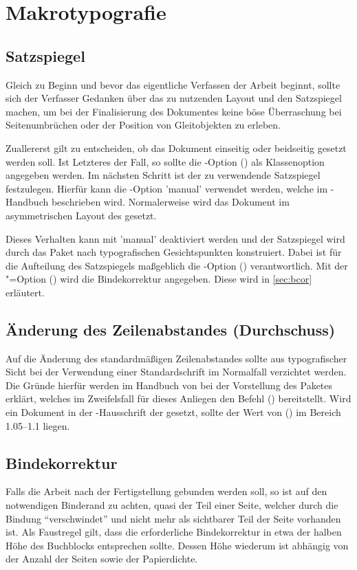 \documentclass[%
  english,ngerman,%
  cdgeometry=no,DIV=12,automark,%
]{tudscrartcl}
\begin{document}
\section{Makrotypografie}
\subsection{Satzspiegel}
Gleich zu Beginn und bevor das eigentliche Verfassen der Arbeit beginnt, sollte 
sich der Verfasser Gedanken über das zu nutzenden Layout und den Satzspiegel 
machen, um bei der Finalisierung des Dokumentes keine böse Überraschung bei 
Seitenumbrüchen oder der Position von Gleitobjekten zu erleben.

Zuallererst gilt zu entscheiden, ob das Dokument einseitig oder beidseitig 
gesetzt werden soll. Ist Letzteres der Fall, so sollte die \KOMAScript-Option 
() als Klassenoption angegeben werden. Im 
nächsten Schritt ist der zu verwendende Satzspiegel festzulegen. Hierfür kann 
die \TUDScript-Option 'manual' verwendet werden, welche im 
\TUDScript-Handbuch beschrieben wird. Normalerweise wird das Dokument im 
asymmetrischen Layout des \CDs gesetzt.

Dieses Verhalten kann mit 'manual' deaktiviert werden 
und der Satzspiegel wird durch das Paket  nach typografischen 
Gesichtspunkten konstruiert. Dabei ist für die Aufteilung des Satzspiegels 
maßgeblich die \KOMAScript-Option () 
verantwortlich. Mit der \KOMAScript"=Option () 
wird die Bindekorrektur angegeben. Diese wird in \autoref{sec:bcor} erläutert.

\subsection{Änderung des Zeilenabstandes (Durchschuss)}
Auf die Änderung des standardmäßigen Zeilenabstandes sollte aus typografischer 
Sicht bei der Verwendung einer Standardschrift im Normalfall verzichtet werden. 
Die Gründe hierfür werden im Handbuch von \TUDScript bei der Vorstellung des 
Paketes  erklärt, welches im Zweifelsfall für dieses Anliegen 
den Befehl () bereitstellt. Wird ein 
Dokument in der \Univers-Hausschrift der \TnUD gesetzt, sollte der Wert von 
() im Bereich 1.05--1.1 liegen.

\subsection{Bindekorrektur}
\label{sec:bcor}%
%
Falls die Arbeit nach der Fertigstellung gebunden werden soll, so ist auf den 
notwendigen Binderand zu achten, quasi der Teil einer Seite, welcher durch die 
Bindung \enquote{verschwindet} und nicht mehr als sichtbarer Teil der Seite 
vorhanden ist. Als Faustregel gilt, dass die erforderliche Bindekorrektur in 
etwa der halben Höhe des Buchblocks entsprechen sollte. Dessen Höhe wiederum 
ist abhängig von der Anzahl der Seiten sowie der Papierdichte.
\end{document}
